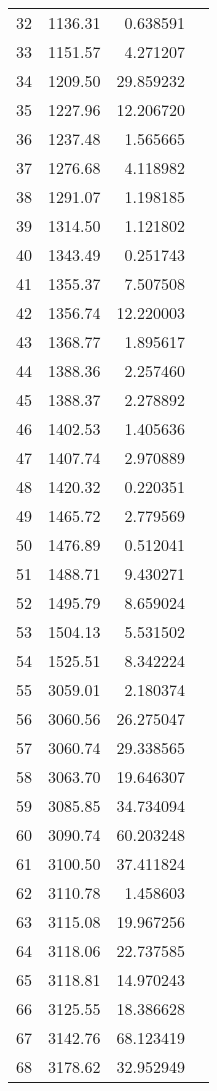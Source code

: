 \begin{tabular}{r|rr|l}
32 &     1136.31 &   0.638591  & \\
33 &     1151.57 &   4.271207  & \\
34 &     1209.50 &  29.859232  & \\
35 &     1227.96 &  12.206720  & \\
36 &     1237.48 &   1.565665  & \\
37 &     1276.68 &   4.118982  & \\
38 &     1291.07 &   1.198185  & \\
39 &     1314.50 &   1.121802  & \\
40 &     1343.49 &   0.251743  & \\
41 &     1355.37 &   7.507508  & \\
42 &     1356.74 &  12.220003  & \\
43 &     1368.77 &   1.895617  & \\
44 &     1388.36 &   2.257460  & \\
45 &     1388.37 &   2.278892  & \\
46 &     1402.53 &   1.405636  & \\
47 &     1407.74 &   2.970889  & \\
48 &     1420.32 &   0.220351  & \\
49 &     1465.72 &   2.779569  & \\
50 &     1476.89 &   0.512041  & \\
51 &     1488.71 &   9.430271  & \\
52 &     1495.79 &   8.659024  & \\
53 &     1504.13 &   5.531502  & \\
54 &     1525.51 &   8.342224  & \\
55 &     3059.01 &   2.180374  & \\
56 &     3060.56 &  26.275047  & \\
57 &     3060.74 &  29.338565  & \\
58 &     3063.70 &  19.646307  & \\
59 &     3085.85 &  34.734094  & \\
60 &     3090.74 &  60.203248  & \\
61 &     3100.50 &  37.411824  & \\
62 &     3110.78 &   1.458603  & \\
63 &     3115.08 &  19.967256  & \\
64 &     3118.06 &  22.737585  & \\
65 &     3118.81 &  14.970243  & \\
66 &     3125.55 &  18.386628  & \\
67 &     3142.76 &  68.123419  & \\
68 &     3178.62 &  32.952949  & \\
  \bottomrule
  \end{tabular}
\normalsize


